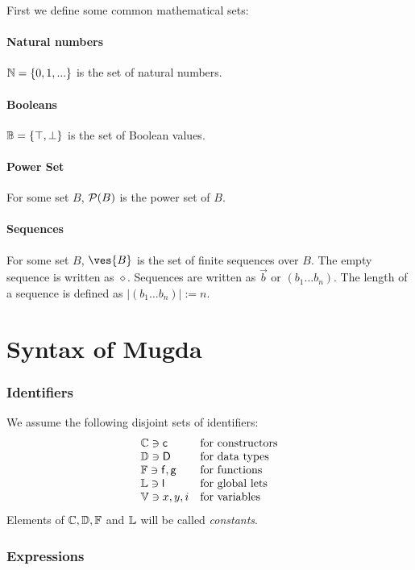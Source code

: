 First we define some common mathematical sets:
\paragraph*{Natural numbers}
$ \mathbb{N} = \{ 0 , 1 , ... \} $ is the set of natural numbers.
\paragraph*{Booleans}
$ \mathbb{B} = \{ \top, \bot \} $ is the set of Boolean values.
\paragraph*{Power Set}
For some set $B$, $\mathcal{P}(B)$ is the power set of $B$.
\paragraph*{Sequences}
For some set $B$, $\ves{B}$ is the set of finite sequences over $B$.
The empty sequence is written as $\diamond$.
Sequences are written as $\vec{b}$ or $(b_1 \ldots b_n)$.
The length of a sequence is defined as $\vert(b_1 \ldots b_n)\vert := n $. 
\section{Syntax of Mugda}

\subsubsection{Identifiers}
We assume the following disjoint sets of identifiers:
\[
\begin{array}{ll}
\mathbb{C} \ni \mathsf{c} & \mbox{for constructors}\\
\mathbb{D} \ni \mathsf{D} & \mbox{for data types}\\
\mathbb{F} \ni \mathsf{f} , \mathsf{g} & \mbox{for functions}\\
\mathbb{L} \ni \mathsf{l} & \mbox{for global lets}\\
\mathbb{V} \ni x,y,i & \mbox{for variables}
\end{array}
\]
Elements of $\mathbb{C}, \mathbb{D} , \mathbb{F}$ and $\mathbb{L}$ will be called \emph{constants}.


\subsubsection{Expressions}

